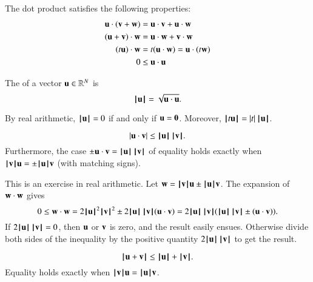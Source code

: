 The dot product satisfies the following
properties:
\begin{align}\label{eqn:dot}
\u \cdot (\v + \w) &= \u \cdot \v + \u \cdot \w\nonumber\\
(\u + \v)\cdot \w &= \u \cdot \w + \v \cdot \w\nonumber\\
(t \u)\cdot \w &= t(\u \cdot \w) = \u \cdot (t \w)\\
0 &\le \u\cdot \u\nonumber
\end{align}


\begin{definition}[norm]
\label{def:norm}
The  of a vector $\u\in\ring{R}^N$ is
\[ \normo{\u} = \sqrt{\u\cdot \u}.\] 
%
\end{definition}

By  real arithmetic,
$\normo{\u}=0$  if and only if $\u=\orz$.  Moreover,
$\normo{ t \u } = |t| \, \normo{\u}$.   



\begin{lemma}
  \[ |\u \cdot \v| \le
    \normo{\u}\,\normo{\v}.\]  Furthermore, the case
  $\pm \u\cdot \v = \normo{\u}\,\normo{\v}$ of equality holds exactly
  when $\normo{\v} \u = \pm\normo{\u} \v$ (with matching signs).
\end{lemma}
%

\begin{proved}
  This is an exercise in real arithmetic.  Let $\w = \normo{\v} \u \pm
  \normo{\u} \v$.  The expansion of $\w\cdot \w$ gives
  \[ 0\le \w\cdot \w = 2\normo{\u}^2\normo{\v}^2 \pm
    2\normo{\u}\, \normo{\v} (\u\cdot \v) = 2\normo{\u}\, \normo{\v}
    (\normo{\u}\, \normo{\v} \pm (\u \cdot \v)).\]  If
  $2\normo{\u} \,\normo{\v} = 0$, then $\u$ or $\v$ is zero, and the
  result easily ensues.  Otherwise divide both sides of the
  inequality by the positive quantity $2 \normo{\u} \,\normo{\v}$ to
  get the result.  \swallowed\end{proved}

\begin{lemma}
\label{lemma:triangle-ineq}
\[ 
\normo{\u + \v} \le \normo{\u} + \normo{\v }.
\] 
Equality holds exactly when $\normo{\v}\u = \normo{\u}\v$.
\end{lemma}
%

